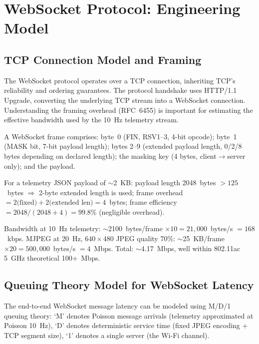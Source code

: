 \section{WebSocket Protocol: Engineering Model}

\subsection{TCP Connection Model and Framing}
\label{sec:videobandwidth}

The WebSocket protocol operates over a TCP connection, inheriting TCP's reliability and ordering guarantees. The protocol handshake uses HTTP/1.1 Upgrade, converting the underlying TCP stream into a WebSocket connection. Understanding the framing overhead (RFC~6455) is important for estimating the effective bandwidth used by the 10~Hz telemetry stream.

\begin{eqblock}
A WebSocket frame comprises: byte~0 (FIN, RSV1--3, 4-bit opcode); byte~1 (MASK bit, 7-bit payload length); bytes 2--9 (extended payload length, 0/2/8 bytes depending on declared length); the masking key (4 bytes, client$\to$server only); and the payload.

For a telemetry JSON payload of $\sim$2~KB: payload length 2048~bytes $>125$~bytes $\Rightarrow$ 2-byte extended length is used; frame overhead $= 2\text{(fixed)} + 2\text{(extended len)} = 4$~bytes; frame efficiency $= 2048/(2048+4) = 99.8\%$ (negligible overhead).

Bandwidth at 10~Hz telemetry: $\sim$2100~bytes/frame $\times10 = 21{,}000$~bytes/s $=168$~kbps. MJPEG at 20~Hz, $640\times480$ JPEG quality 70\%: $\sim$25~KB/frame $\times20 = 500{,}000$~bytes/s $=4$~Mbps. Total: $\sim$4.17~Mbps, well within 802.11ac 5~GHz theoretical 100+~Mbps.
\end{eqblock}

\subsection{Queuing Theory Model for WebSocket Latency}

The end-to-end WebSocket message latency can be modeled using M/D/1 queuing theory: `M' denotes Poisson message arrivals (telemetry approximated at Poisson 10~Hz), `D' denotes deterministic service time (fixed JPEG encoding + TCP segment size), `1' denotes a single server (the Wi-Fi channel).

